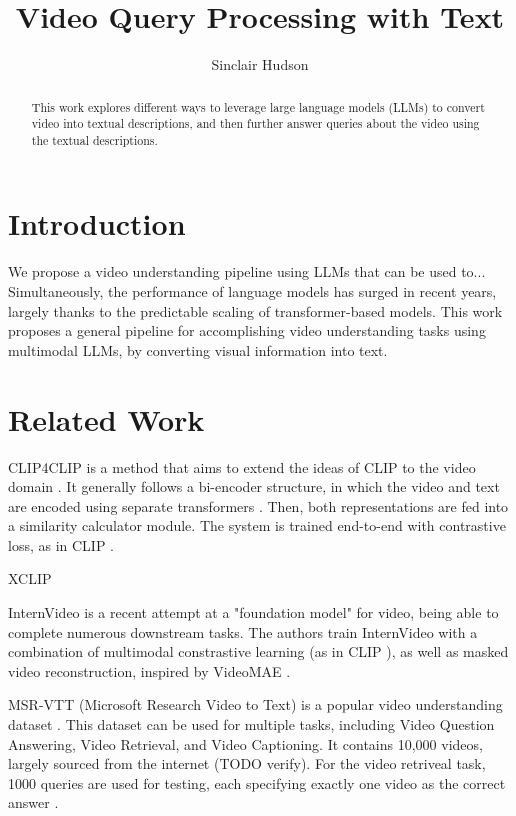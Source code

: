 \documentclass{article}
\title{Video Query Processing with Text}
\author{Sinclair Hudson}
\begin{document}
\maketitle

\begin{abstract}
      This work explores different ways to leverage large language models (LLMs) to convert video into textual descriptions, and then further answer queries about the video using the textual descriptions.
\end{abstract}

\section{Introduction}

We propose a video understanding pipeline using LLMs that can be used to...
Simultaneously, the performance of language models has surged in recent years, largely thanks to the predictable scaling of transformer-based models.
This work proposes a general pipeline for accomplishing video understanding tasks using multimodal LLMs, by converting visual information into text.

\section{Related Work}

CLIP4CLIP is a method that aims to extend the ideas of CLIP \cite{clip} to the video domain \cite{clip4clip}.
It generally follows a bi-encoder structure, in which the video and text are encoded using separate transformers \cite{transformer}. Then, both representations are fed into a similarity calculator module.
The system is trained end-to-end with contrastive loss, as in CLIP \cite{clip}.

XCLIP \cite{xclip}

InternVideo is a recent attempt at a "foundation model" for video, being able to complete numerous downstream tasks.
The authors train InternVideo with a combination of multimodal constrastive learning (as in CLIP \cite{clip}), as well as masked video reconstruction, inspired by VideoMAE \cite{videomae}.

MSR-VTT (Microsoft Research Video to Text) is a popular video understanding dataset \cite{msr-vtt}.
This dataset can be used for multiple tasks, including Video Question Answering, Video Retrieval, and Video Captioning.
It contains 10,000 videos, largely sourced from the internet (TODO verify).
For the video retriveal task, 1000 queries are used for testing, each specifying exactly one video as the correct answer \cite{jsfusion}.
\end{document}
